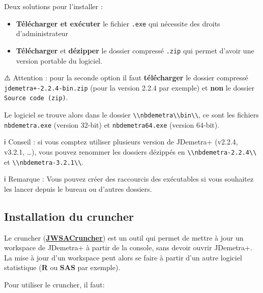 \documentclass[
]{article}
\providecommand{\tightlist}{%
  \setlength{\itemsep}{0pt}\setlength{\parskip}{0pt}}
\begin{document}
Deux solutions pour l'installer :

\begin{itemize}
\tightlist
\item
  \textbf{Télécharger et exécuter} le fichier \texttt{.exe} qui
  nécessite des droits d'administrateur
\item
  \textbf{Télécharger} et \textbf{dézipper} le dossier compressé
  \texttt{.zip} qui permet d'avoir une version portable du logiciel.
\end{itemize}

⚠️ Attention : pour la seconde option il faut \textbf{télécharger} le
dossier compressé \texttt{jdemetra+-2.2.4-bin.zip} (pour la version
2.2.4 par exemple) et \textbf{non} le dossier
\texttt{Source\ code\ (zip)}.

Le logiciel se trouve alors dans le dossier
\textcolor{windows_path_color}{\nolinkurl{\\nbdemetra\\bin\\}}, ce sont
les fichiers \texttt{nbdemetra.exe} (version 32-bit) et
\texttt{nbdemetra64.exe} (version 64-bit).

ℹ️ Conseil : si vous comptez utiliser plusieurs version de JDemetra+
(v2.2.4, v3.2.1, \ldots), vous pouvez renommer les dossiers dézippés en
\textcolor{windows_path_color}{\nolinkurl{\\nbdemetra-2.2.4\\}} et
\textcolor{windows_path_color}{\nolinkurl{\\nbdemetra-3.2.1\\}}.

ℹ️ Remarque : Vous pouvez créer des raccourcis des exécutables si vous
souhaitez les lancer depuis le bureau ou d'autres dossiers.

\hypertarget{installation-du-cruncher}{%
\subsection{Installation du cruncher}\label{installation-du-cruncher}}

Le cruncher
(\href{https://github.com/jdemetra/jwsacruncher}{\textbf{JWSACruncher}})
est un outil qui permet de mettre à jour un workspace de JDemetra+ à
partir de la console, sans devoir ouvrir JDemetra+. La mise à jour d'un
workspace peut alors se faire à partir d'un autre logiciel statistique
(\textbf{R} ou \textbf{SAS} par exemple).

Pour utiliser le cruncher, il faut:
\end{document}
